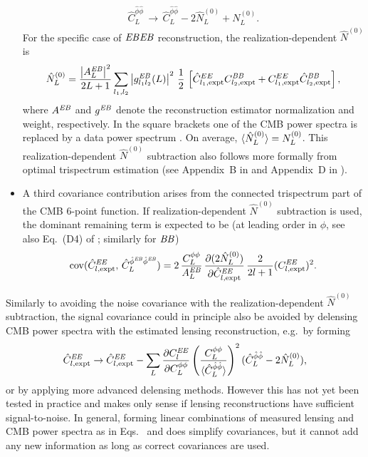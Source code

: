 \documentclass[prd,superscriptaddress,nofootinbib,floatfix,notitlepage]{revtex4-1}
\begin{document}
\begin{itemize}
\begin{align}
  \label{eq:RDN0procedure}
  \hat C^{\hat\phi\hat\phi}_L \,\rightarrow \,
\hat C^{\hat\phi\hat\phi}_L - 2 \hat N^{(0)}_L + N^{(0)}_{L}.
\end{align}
For the specific case of $\mathit{EB}\mathit{EB}$ reconstruction, the realization-dependent $\hat N^{(0)}$ is 
\begin{align}
  \label{eq:RDN0}
  \hat N^{(0)}_L = \frac{\left|A_L^{\mathit{EB}}\right|^2}{2L+1}\sum_{l_1,l_2} 
\left| g^{\mathit{EB}}_{l_1l_2}(L) \right|^2
\,\frac{1}{2}\,\left[\hat C^{EE}_{l_1,\mathrm{expt}} C^{\mathit{BB}}_{l_2,\mathrm{expt}}+ C^{EE}_{l_1,\mathrm{expt}} \hat C^{\mathit{BB}}_{l_2,\mathrm{expt}}\right],
\end{align}
where $A^{\mathit{EB}}$ and $g^{\mathit{EB}}$ denote the reconstruction estimator normalization and weight, respectively. 
In the square brackets one of the CMB power spectra is replaced by a data power spectrum . On average,  $\langle\hat N^{(0)}_L\rangle=N^{(0)}_L$.  This realization-dependent $\hat N^{(0)}$ subtraction also follows more formally from optimal trispectrum estimation (see Appendix~B in \cite{marcel1308} and Appendix~D in \cite{Planck2013Lensing}).
\item A third covariance contribution  arises from the connected trispectrum part of the CMB 6-point function. If realization-dependent $\hat N^{(0)}$  subtraction is used, the dominant remaining term is expected to be (at leading order in $\phi$, see also Eq.~(D4) of \cite{marcel1308}; similarly for $\mathit{BB}$)
\begin{align}
  \label{eq:cov_EBEB_EE}
      \mathrm{cov}(\hat C_{l,\mathrm{expt}}^{\mathit{EE}},\, \hat C_L^{\hat\phi^{\mathit{EB}}\hat\phi^{\mathit{EB}}}) = 
2\,\frac{C^{\phi\phi}_L}{A_L^{\mathit{EB}}}\,
\frac{\partial (2\hat N_L^{(0)})}{\partial \hat C^{\mathit{EE}}_{l,\mathrm{expt}}}\,
\frac{2}{2l+1}
(C^{\mathit{EE}}_{l,\mathrm{expt}})^2.
\end{align}

\end{itemize}

Similarly to avoiding the noise covariance with the realization-dependent $\hat N^{(0)}$ subtraction, the signal covariance could in principle also be avoided by delensing CMB power spectra with the estimated lensing reconstruction, e.g.~by forming \cite{marcel1308}
\begin{equation}
  \label{eq:matter_CV_mitigation}
  \hat C^{\mathit{EE}}_{l,\mathrm{expt}} \rightarrow  \hat C^{\mathit{EE}}_{l,\mathrm{expt}}- 
\sum_{L} 
 \frac{\partial C_{l}^{\mathit{EE}}}{\partial C_{L}^{\phi\phi}}
\left(\frac{C_{L}^{\phi\phi}}{\langle
\hat{C}_{L}^{\hat{\phi}\hat{\phi}}\rangle}\right)^2
(\hat{C}_{L}^{\hat{\phi}\hat{\phi}}-2\hat{N}_{L}^{(0)}),
\end{equation}
or by applying more advanced delensing methods.  However this has not yet been tested in practice and makes only sense if lensing reconstructions have sufficient signal-to-noise.  In general, forming linear combinations of measured lensing and CMB power spectra as in Eqs.~ and  does simplify covariances, but it cannot add any new information as long as correct covariances are used.
\end{document}
